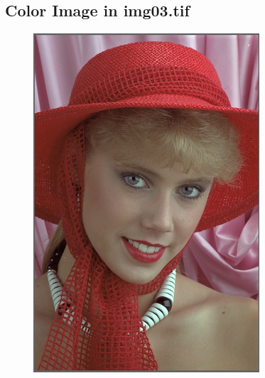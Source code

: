 \documentclass{article}
\begin{document}
\subsection{Color Image in img03.tif}
\begin{figure}[H]
    \centering
    \includegraphics[width=0.75\textwidth]{../results/img03.png}
    \begin{center}
    \end{center}
\end{figure}
\end{document}
